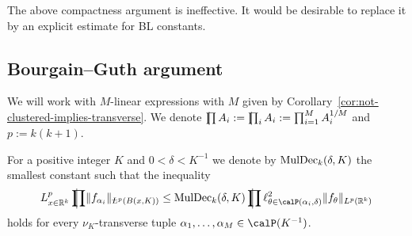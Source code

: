 \begin{remark}
The above compactness argument is ineffective.
It would be desirable to replace it by an explicit estimate for BL constants.
\end{remark}

\subsection{Bourgain--Guth argument}
We will work with $M$-linear expressions with $M$ given by Corollary~\ref{cor:not-clustered-implies-transverse}.
We denote $\avprod A_{i} := \avprod_{i} A_{i} := \prod_{i=1}^{M} A_{i}^{1/M}$ and $p:=k(k+1)$.

For a positive integer $K$ and $0 < \delta < K^{-1}$ we denote by $\mathrm{MulDec}_{k}(\delta, K)$ the smallest constant such that the inequality
\begin{equation}
\label{eq:multilin-dec-const-KM}
L^{p}_{x\in \R^{k}} \avprod \norm{ f_{\alpha_{i}} }_{\avL^{p}(B(x,K))}\\
\le \MulDec_{k}(\delta, K)
\avprod \ell^{2}_{\theta \in \Part[\alpha_i]{\delta}} \norm{ f_{\theta} }_{L^p(\R^{k})}
\end{equation}
holds for every $\nu_{K}$-transverse tuple $\alpha_{1},\dotsc,\alpha_{M} \in \Part{K^{-1}}$.

